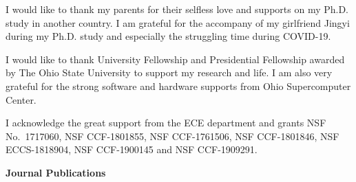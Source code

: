 \documentclass{osudissert96}
\begin{document}
\begin{acknowledgements}
I would like to thank my parents for their selfless love and supports on my Ph.D. study in another country. I am grateful for the accompany of my girlfriend Jingyi during my Ph.D. study and especially the struggling time during COVID-19.

I would like to thank University Fellowship and Presidential Fellowship awarded by The Ohio State University to support my research and life. I am also very grateful for the strong software and hardware supports from Ohio Supercomputer Center.

I acknowledge the great support from the ECE department and grants NSF No.~1717060, NSF CCF-1801855, 
NSF CCF-1761506, NSF CCF-1801846, NSF ECCS-1818904, NSF CCF-1900145 and NSF CCF-1909291.
\end{acknowledgements} 

\begin{vita}





\begin{publist}


\noindent\textbf{Journal Publications}\newline




\end{publist}
\end{vita}
\end{document}

